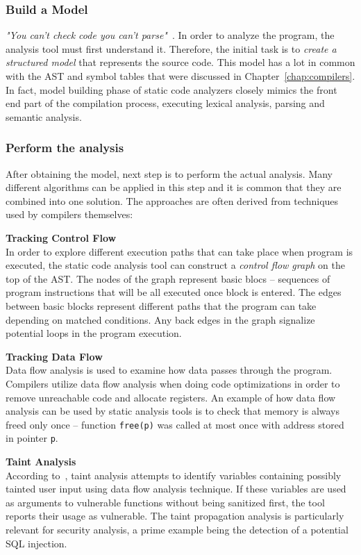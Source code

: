 \documentclass[
  digital, %
  table,   %
  lof,     %
  lot,     %
  oneside,
]{fithesis3}
\begin{document}
\subsubsection{Build a Model}
\textit{"You can't check code you can't parse"}~\cite{coverity-sca}.
In order to analyze the program, the analysis tool must first understand it. Therefore, the initial task is to \textit{create a structured model} that represents the source code. This model has a lot in common with the AST and symbol tables that were discussed in Chapter~\ref{chap:compilers}. In fact, model building phase of static code analyzers closely mimics the front end part of the compilation process, executing lexical analysis, parsing and semantic analysis.

\subsubsection{Perform the analysis}
After obtaining the model, next step is to perform the actual analysis. Many different algorithms can be applied in this step and it is common that they are combined into one solution. The approaches are often derived from techniques used by compilers themselves:

\smallskip\noindent
\textbf{Tracking Control Flow} \\ \noindent
In order to explore different execution paths that can take place when program is executed, the static code analysis tool can construct a \textit{control flow graph} on the top of the AST. The nodes of the graph represent basic blocs -- sequences of program instructions that will be all executed once block is entered. The edges between basic blocks represent different paths that the program can take depending on matched conditions. Any back edges in the graph signalize potential loops in the program execution.

\smallskip\noindent
\textbf{Tracking Data Flow} \\ \noindent
Data flow analysis is used to examine how data passes through the program. Compilers utilize data flow analysis when doing code optimizations in order to remove unreachable code and allocate registers. An example of how data flow analysis can be used by static analysis tools is to check that memory is always freed only once -- function \texttt{free(p)} was called at most once with address stored in pointer \texttt{p}.

\smallskip\noindent
\textbf{Taint Analysis} \\ \noindent
According to~\cite{oswap-sca}, taint analysis attempts to identify variables containing possibly tainted user input using data flow analysis technique. If these variables are used as arguments to vulnerable functions without being sanitized first, the tool reports their usage as vulnerable. The taint propagation analysis is particularly relevant for security analysis, a prime example being the detection of a potential SQL injection.
\end{document}
